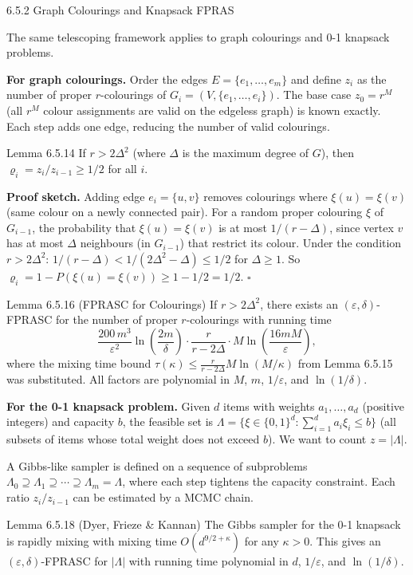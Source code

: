 \documentclass[aspectratio=169,10pt]{beamer}
\begin{document}
\begin{frame}[allowframebreaks]{6.5.2 Graph Colourings and Knapsack FPRAS}

The same telescoping framework applies to graph colourings and 0-1 knapsack problems.

\textbf{For graph colourings.}
Order the edges $E = \{e_1, \ldots, e_m\}$ and define $z_i$ as the number of proper $r$-colourings of $G_i = (V, \{e_1,\ldots,e_i\})$.
The base case $z_0 = r^M$ (all $r^M$ colour assignments are valid on the edgeless graph) is known exactly.
Each step adds one edge, reducing the number of valid colourings.

\begin{block}{Lemma 6.5.14}
If $r > 2\Delta^2$ (where $\Delta$ is the maximum degree of $G$), then $\varrho_i = z_i/z_{i-1} \ge 1/2$ for all $i$.

\textbf{Proof sketch.}
Adding edge $e_i = \{u,v\}$ removes colourings where $\xi(u) = \xi(v)$ (same colour on a newly connected pair).
For a random proper colouring $\xi$ of $G_{i-1}$, the probability that $\xi(u) = \xi(v)$ is at most $1/(r - \Delta)$, since vertex $v$ has at most $\Delta$ neighbours (in $G_{i-1}$) that restrict its colour.
Under the condition $r > 2\Delta^2$: $1/(r - \Delta) < 1/(2\Delta^2 - \Delta) \le 1/2$ for $\Delta \ge 1$.
So $\varrho_i = 1 - P(\xi(u) = \xi(v)) \ge 1 - 1/2 = 1/2$. $\square$
\end{block}

\framebreak

\begin{block}{Lemma 6.5.16 (FPRASC for Colourings)}
If $r > 2\Delta^2$, there exists an $(\varepsilon, \delta)$-FPRASC for the number of proper $r$-colourings with running time
\[
  \frac{200\,m^3}{\varepsilon^2}\ln\!\left(\frac{2m}{\delta}\right)\cdot\frac{r}{r - 2\Delta}\cdot M \ln\!\left(\frac{16mM}{\varepsilon}\right),
\]
where the mixing time bound $\tau(\kappa) \le \frac{r}{r-2\Delta} M \ln(M/\kappa)$ from Lemma 6.5.15 was substituted.
All factors are polynomial in $M$, $m$, $1/\varepsilon$, and $\ln(1/\delta)$.
\end{block}

\textbf{For the 0-1 knapsack problem.}
Given $d$ items with weights $a_1, \ldots, a_d$ (positive integers) and capacity $b$, the feasible set is $\Lambda = \{\xi \in \{0,1\}^d : \sum_{i=1}^d a_i \xi_i \le b\}$ (all subsets of items whose total weight does not exceed $b$).
We want to count $z = |\Lambda|$.

A Gibbs-like sampler is defined on a sequence of subproblems $\Lambda_0 \supseteq \Lambda_1 \supseteq \cdots \supseteq \Lambda_m = \Lambda$, where each step tightens the capacity constraint.
Each ratio $z_i/z_{i-1}$ can be estimated by a MCMC chain.

\begin{block}{Lemma 6.5.18 (Dyer, Frieze \& Kannan)}
The Gibbs sampler for the 0-1 knapsack is rapidly mixing with mixing time $O(d^{9/2+\kappa})$ for any $\kappa > 0$.
This gives an $(\varepsilon,\delta)$-FPRASC for $|\Lambda|$ with running time polynomial in $d$, $1/\varepsilon$, and $\ln(1/\delta)$.
\end{block}

\end{frame}
\end{document}
